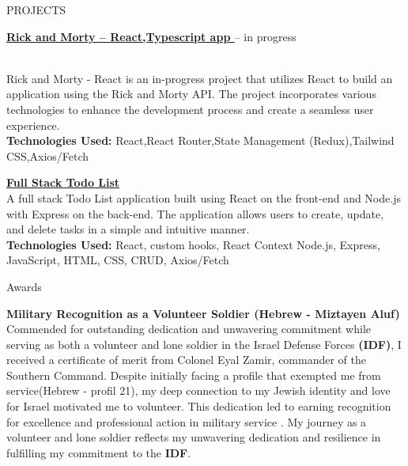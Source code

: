 \documentclass{resume}
\begin{document}
 \begin{rSection}{PROJECTS}
  \begin{itemize}
   \item \textbf{\href{https://github.com/Asnvir/React-TS-RickMorty}{Rick and Morty – React,Typescript app }}– in progress {\\Rick and Morty - React is an in-progress project that utilizes React to build an application using the Rick and Morty API. The project incorporates various technologies to enhance the development process and create a seamless user experience.\\
   \textbf{Technologies Used:}  React,React Router,State Management (Redux),Tailwind CSS,Axios/Fetch

   \vspace{0.25em} %
   \item \textbf{{\href{https://github.com/Asnvir/todo-react-app}{Full Stack Todo List }}}{\\A full stack Todo List application built using React on the front-end and Node.js with Express on the back-end. The application allows users to create, update, and delete tasks in a simple and intuitive manner.\\
   \textbf{Technologies Used:} React, custom hooks, React Context Node.js, Express, JavaScript, HTML, CSS, CRUD, Axios/Fetch}
   }
  \end{itemize}
 \end{rSection}


 \begin{rSection}{Awards}
  \vspace{-1.25em}
  \item \textbf{Military Recognition as a Volunteer Soldier (Hebrew - Miztayen Aluf)}
  \\Commended for outstanding dedication and unwavering commitment while serving as
  both a volunteer and lone soldier in the Israel Defense Forces \textbf{(IDF)}, I received a
  certificate of merit from Colonel Eyal Zamir, commander of the Southern Command.
  Despite initially facing a profile that exempted me from service(Hebrew - profil 21), my deep
  connection to my Jewish identity and love for Israel motivated me to volunteer. This
  dedication led to earning recognition for excellence and professional action in military
  service . My journey as a volunteer and lone soldier reflects my unwavering dedication
  and resilience in fulfilling my commitment to the \textbf{IDF}.
 \end{rSection}
\end{document}
